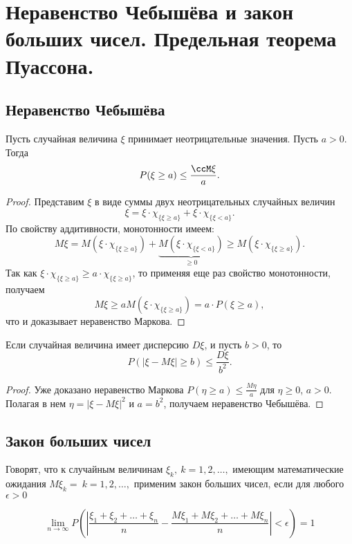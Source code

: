 \chapter{Неравенство Чебышёва и закон больших чисел. Предельная теорема Пуассона.}
\section{Неравенство Чебышёва}
\begin{thm}
Пусть случайная величина $\xi$ принимает неотрицательные значения. Пусть $a>0$. Тогда 
$$
P(\xi \ge a)\le\frac{\ccM\xi}{a}.
$$
\end{thm}
\begin{proof}
Представим $\xi$ в виде суммы двух неотрицательных случайных величин
$$
\xi = \xi\cdot\chi_{\{\xi\ge a\}}+\xi\cdot\chi_{\{\xi< a\}}.
$$
По свойству аддитивности, монотонности имеем:
$$
M \xi=M (\xi\cdot\chi_{\{\xi\ge a\}})+\underbrace{M (\xi\cdot\chi_{\{\xi< a\}})}_{\ge 0} \ge M (\xi\cdot\chi_{\{\xi\ge a\}}).
$$
Так как $\xi\cdot\chi_{\{\xi\ge a\}}\ge a\cdot\chi_{\{\xi\ge a\}}$, то применяя еще раз свойство монотонности, получаем
$$
M \xi\ge aM (\xi\cdot\chi_{\{\xi\ge a\}})=a\cdot P(\xi\ge a),
$$
что и доказывает неравенство Маркова.
\end{proof}

\begin{thm}
Если случайная величина имеет дисперсию $D \xi$, и пусть $b>0$, то
$$
P(|\xi-M \xi|\ge b ) \le\frac{D \xi}{b^2}.
$$
\end{thm} 
\begin{proof}
Уже доказано неравенство Маркова $P(\eta \ge a) \le \frac{M\eta}{a}$  для $\eta \ge 0$, $a>0$. Полагая в нем $\eta = |\xi-M \xi|^2$ и $a=b^2$, получаем неравенство Чебышёва.
\end{proof}

\section{Закон больших чисел}

Говорят, что к случайным величинам $\xi_k, \: k = 1, 2, \ldots,$ имеющим математические ожидания $M\xi_k = \: k = 1, 2,\ldots,$ применим закон больших чисел, если для любого $\epsilon > 0$

\begin{equation} \label{ch32.2eq4}
\lim_{n \to \infty} P \left( \left| \frac{\xi_1 + \xi_2 + \ldots + \xi_n}{n} - \frac{M \xi_1 + M \xi_2 + \ldots + M \xi_n}{n} \right| < \epsilon \right) = 1
\end{equation}

